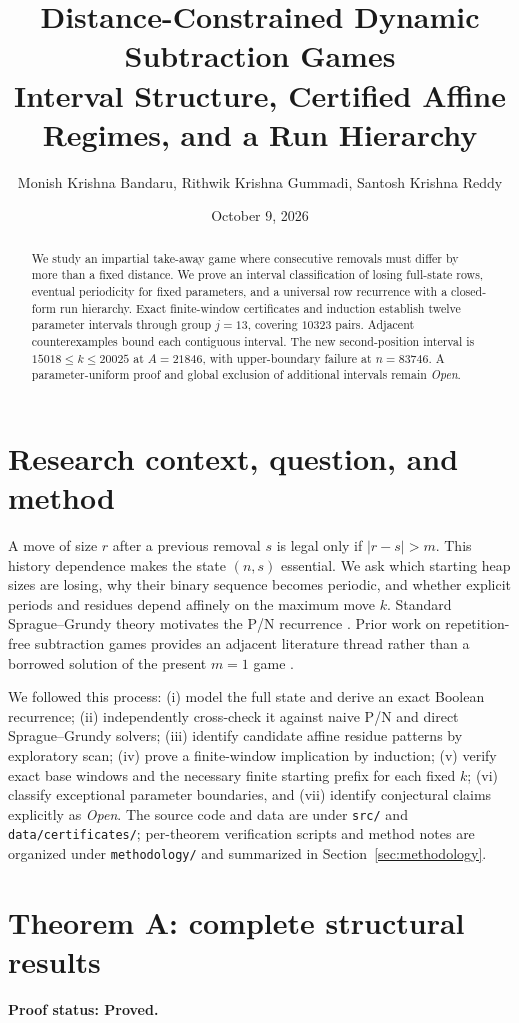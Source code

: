 \documentclass[11pt]{article}
\title{\textbf{Distance-Constrained Dynamic Subtraction Games}\\[0.4em]
\large Interval Structure, Certified Affine Regimes, and a Run Hierarchy}
\author{Monish Krishna Bandaru, Rithwik Krishna Gummadi, Santosh Krishna Reddy}
\date{October 9, 2026}
\theoremstyle{remark}
\newcommand{\statusproved}{\textbf{Proof status: Proved.}}
\begin{document}
\maketitle
\begin{abstract}
We study an impartial take-away game where consecutive removals must differ by more than a fixed distance. We prove an interval classification of losing full-state rows, eventual periodicity for fixed parameters, and a universal row recurrence with a closed-form run hierarchy. Exact finite-window certificates and induction establish twelve parameter intervals through group $j=13$, covering $10323$ pairs. Adjacent counterexamples bound each contiguous interval. The new second-position interval is $15018\le k\le20025$ at $A=21846$, with upper-boundary failure at $n=83746$. A parameter-uniform proof and global exclusion of additional intervals remain \emph{Open}.
\end{abstract}
\tableofcontents
\section{Research context, question, and method}
A move of size $r$ after a previous removal $s$ is legal only if $|r-s|>m$. This history dependence makes the state $(n,s)$ essential. We ask which starting heap sizes are losing, why their binary sequence becomes periodic, and whether explicit periods and residues depend affinely on the maximum move $k$. Standard Sprague--Grundy theory motivates the P/N recurrence \cite{sprague1935,grundy1939,winningways2001}. Prior work on repetition-free subtraction games provides an adjacent literature thread rather than a borrowed solution of the present $m=1$ game \cite{gurvich2012}.

We followed this process: (i) model the full state and derive an exact Boolean recurrence; (ii) independently cross-check it against naive P/N and direct Sprague--Grundy solvers; (iii) identify candidate affine residue patterns by exploratory scan; (iv) prove a finite-window implication by induction; (v) verify exact base windows and the necessary finite starting prefix for each fixed $k$; (vi) classify exceptional parameter boundaries, and (vii) identify conjectural claims explicitly as \emph{Open}. The source code and data are under \texttt{src/} and \texttt{data/certificates/}; per-theorem verification scripts and method notes are organized under \texttt{methodology/} and summarized in Section~\ref{sec:methodology}.
\section{Theorem A: complete structural results}\label{sec:A}
\statusproved
\end{document}
